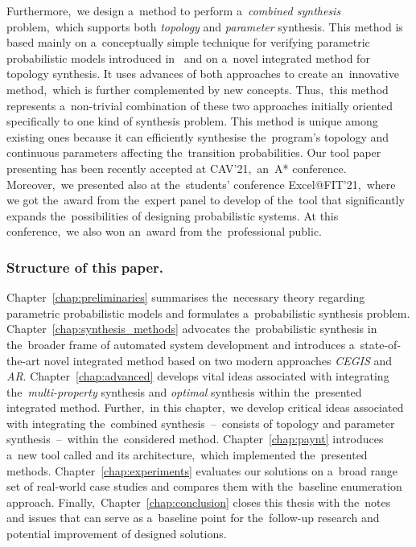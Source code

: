 Furthermore,~we design a~method to perform a~\emph{combined synthesis} problem,~which supports both \emph{topology} and \emph{parameter} synthesis. 
This method is based mainly on a~conceptually simple technique for verifying parametric probabilistic models introduced in~\cite{Quatmann2016} and on a~novel integrated method for topology synthesis.
It uses advances of both approaches to create an~innovative method,~which is further complemented by new concepts.
Thus,~this method represents a~non-trivial combination of these two approaches initially oriented specifically to one kind of synthesis problem. 
This method is unique among existing ones because it can efficiently synthesise the~program's topology and continuous parameters affecting the~transition probabilities.
Our tool paper presenting \toolname{} has been recently accepted at CAV'21,~an~A* conference.
Moreover,~we presented \toolname{} also at the~students' conference Excel@FIT'21,~where we got the~award from the~expert panel to develop of the~tool that significantly expands the~possibilities of designing probabilistic systems.
At this conference,~we also won an~award from the~professional public.


\subsubsection*{Structure of this paper.}
Chapter~\ref{chap:preliminaries} summarises the~necessary theory regarding parametric probabilistic models and formulates a~probabilistic synthesis problem. 
Chapter~\ref{chap:synthesis_methods} advocates the~probabilistic synthesis in the~broader frame of automated system development and introduces a~state-of-the-art novel integrated method based on two modern approaches \textit{CEGIS} and \textit{AR}.
Chapter~\ref{chap:advanced} develops vital ideas associated with integrating the~\textit{multi-property} synthesis and \textit{optimal} synthesis within the~presented integrated method.
Further,~in this chapter,~we develop critical ideas associated with integrating the~combined synthesis \,--\, consists of topology and parameter synthesis \,--\, within the~considered method.
Chapter~\ref{chap:paynt} introduces a~new tool called \toolname{} and its architecture,~which implemented the~presented methods.
Chapter~\ref{chap:experiments} evaluates our solutions on a~broad range set of real-world case studies and compares them with the~baseline enumeration approach.
Finally,~Chapter~\ref{chap:conclusion} closes this thesis with the~notes
and issues that can serve as a~baseline point for the~follow-up research and potential improvement of designed solutions.